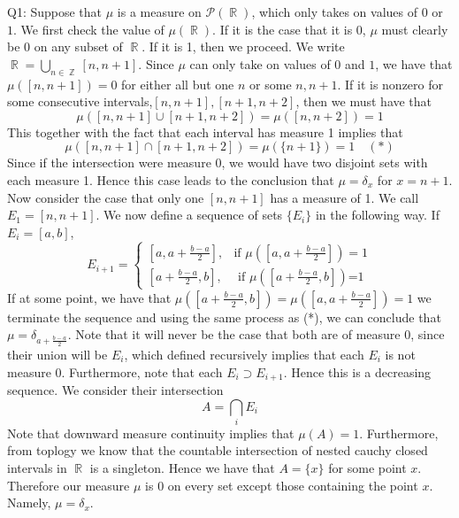 \documentclass[letterpaper]{article}
\DeclareMathOperator{\R}{\mathbb{R}}
\DeclareMathOperator{\Z}{\mathbb{Z}}
\begin{document}
\noindent
Q1: Suppose that $\mu$ is a measure on $\mathcal{P}(\R)$, which only takes on values of $0$ or $1$. We first check the value of $\mu(\R)$. If it is the case that it is 0, $\mu$ must clearly be $0$ on any subset of $\R$. If it is 1, then we proceed. We write $\R = \bigcup_{n \in \Z} [n, n+1]$. Since $\mu$ can only take on values of $0$ and $1$, we have that $\mu([n,n+1])= 0$ for either all but one $n$ or some $n,n+1$. If it is nonzero for some consecutive intervals,$[n,n+1], [n+1,n+2]$, then we must have that $$\mu([n,n+1] \cup [n+1,n+2])= \mu([n,n+2])=1$$ This together with the fact that each interval has measure 1 implies that $$\mu([n,n+1] \cap [n+1,n+2]) = \mu(\{n+1\})=1 \quad(*)$$ Since if the intersection were measure 0, we would have two disjoint sets with each measure 1. Hence this case leads to the conclusion that $\mu = \delta_{x}$ for $x = n+1$. Now consider the case that only one $[n,n+1]$ has a measure of 1. We call $E_1 = [n,n+1]$. We now define a sequence of sets $\{E_i\}$ in the following way. If $E_i = [a,b]$, $$E_{i+1} =\begin{cases}
    [a, a + \frac{b-a}{2}], & \text{if $\mu([a, a + \frac{b-a}{2}])=1$}\\
            [a+ \frac{b-a}{2}, b], & \text{ if $\mu([a+ \frac{b-a}{2}, b])$=1}
\end{cases} $$
If at some point, we have that $\mu([a+ \frac{b-a}{2}, b]) = \mu([a, a + \frac{b-a}{2}])=1$ we terminate the sequence and using the same process as (*), we can conclude that $\mu = \delta_{a+ \frac{b-a}{2}}$. Note that it will never be the case that both are of measure 0, since their union will be $E_i$, which defined recursively implies that each $E_i$ is not measure 0. Furthermore, note that each $E_i \supset E_{i+1}$. Hence this is a decreasing sequence. We consider their intersection $$A = \bigcap_i E_i$$ Note that downward measure continuity implies that $\mu(A) =1$. Furthermore, from toplogy we know that the countable intersection of nested cauchy closed intervals in $\R$ is a singleton. Hence we have that $A = \{x\}$ for some point $x$. Therefore our measure $\mu$ is $0$ on every set except those containing the point $x$. Namely, $\mu = \delta_x$.  
\end{document}
